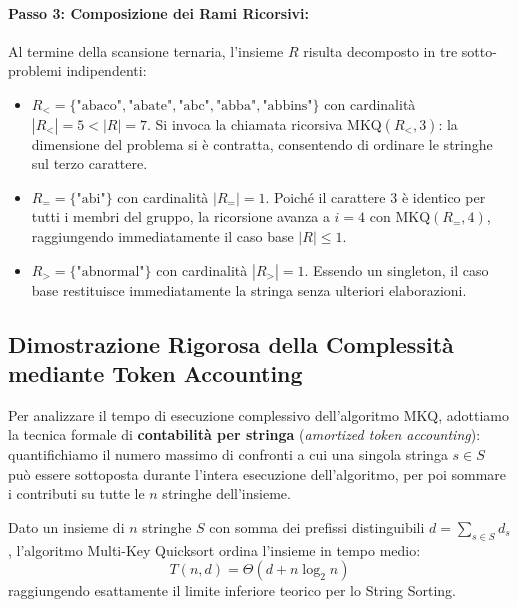 \paragraph{Passo 3: Composizione dei Rami Ricorsivi:}
Al termine della scansione ternaria, l'insieme $R$ risulta decomposto in tre sotto-problemi indipendenti:
\begin{itemize}
  \item $R_< = \{\text{"abaco"}, \text{"abate"}, \text{"abc"}, \text{"abba"}, \text{"abbins"}\}$ con cardinalit\`a $|R_<| = 5 < |R| = 7$. Si invoca la chiamata ricorsiva $\text{MKQ}(R_<, 3)$: la dimensione del problema si \`e contratta, consentendo di ordinare le stringhe sul terzo carattere.
  \item $R_= = \{\text{"abi"}\}$ con cardinalit\`a $|R_=| = 1$. Poich\'e il carattere 3 \`e identico per tutti i membri del gruppo, la ricorsione avanza a $i = 4$ con $\text{MKQ}(R_=, 4)$, raggiungendo immediatamente il caso base $|R| \le 1$.
  \item $R_> = \{\text{"abnormal"}\}$ con cardinalit\`a $|R_>| = 1$. Essendo un singleton, il caso base restituisce immediatamente la stringa senza ulteriori elaborazioni.
\end{itemize}

\FloatBarrier
\subsection{Dimostrazione Rigorosa della Complessità mediante Token Accounting}
\label{subsec:dimostrazione-complessita-mkq}

Per analizzare il tempo di esecuzione complessivo dell'algoritmo $\text{MKQ}$, adottiamo la tecnica formale di \textbf{contabilit\`a per stringa} (\textit{amortized token accounting}): quantifichiamo il numero massimo di confronti a cui una singola stringa $s \in S$ pu\`o essere sottoposta durante l'intera esecuzione dell'algoritmo, per poi sommare i contributi su tutte le $n$ stringhe dell'insieme.

\begin{theorem}
\label{thm:complessita-multikey-quicksort}
Dato un insieme di $n$ stringhe $S$ con somma dei prefissi distinguibili $d = \sum_{s \in S} d_s$, l'algoritmo Multi-Key Quicksort ordina l'insieme in tempo medio:
\begin{equation}
  T(n, d) = \Theta(d + n \log_2 n)
\end{equation}
raggiungendo esattamente il limite inferiore teorico per lo String Sorting.
\end{theorem}

